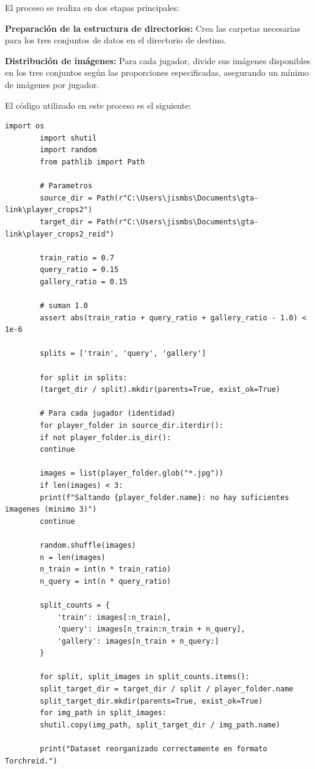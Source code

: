 \documentclass[12pt, a4paper, twoside]{article}
\begin{document}
	El proceso se realiza en dos etapas principales:
	
	\textbf{Preparación de la estructura de directorios:} Crea las carpetas necesarias para los tres conjuntos de datos en el directorio de destino.
	
	\textbf{Distribución de imágenes:} Para cada jugador, divide sus imágenes disponibles en los tres conjuntos según las proporciones especificadas, asegurando un mínimo de imágenes por jugador.
	
	El código utilizado en este proceso es el siguiente:
	\vspace{0.5cm}
	
	\begin{lstlisting}[style=pythonstyle]
		import os
		import shutil
		import random
		from pathlib import Path
		
		# Parametros
		source_dir = Path(r"C:\Users\jismbs\Documents\gta-link\player_crops2")
		target_dir = Path(r"C:\Users\jismbs\Documents\gta-link\player_crops2_reid")
		
		train_ratio = 0.7
		query_ratio = 0.15
		gallery_ratio = 0.15
		
		# suman 1.0
		assert abs(train_ratio + query_ratio + gallery_ratio - 1.0) < 1e-6
		
		splits = ['train', 'query', 'gallery']
		
		for split in splits:
		(target_dir / split).mkdir(parents=True, exist_ok=True)
		
		# Para cada jugador (identidad)
		for player_folder in source_dir.iterdir():
		if not player_folder.is_dir():
		continue
		
		images = list(player_folder.glob("*.jpg"))
		if len(images) < 3:
		print(f"Saltando {player_folder.name}: no hay suficientes imagenes (minimo 3)")
		continue
		
		random.shuffle(images)
		n = len(images)
		n_train = int(n * train_ratio)
		n_query = int(n * query_ratio)
		
		split_counts = {
			'train': images[:n_train],
			'query': images[n_train:n_train + n_query],
			'gallery': images[n_train + n_query:]
		}
		
		for split, split_images in split_counts.items():
		split_target_dir = target_dir / split / player_folder.name
		split_target_dir.mkdir(parents=True, exist_ok=True)
		for img_path in split_images:
		shutil.copy(img_path, split_target_dir / img_path.name)
		
		print("Dataset reorganizado correctamente en formato Torchreid.")
		
	\end{lstlisting}
	\vspace{0.5cm}
	
\end{document}
